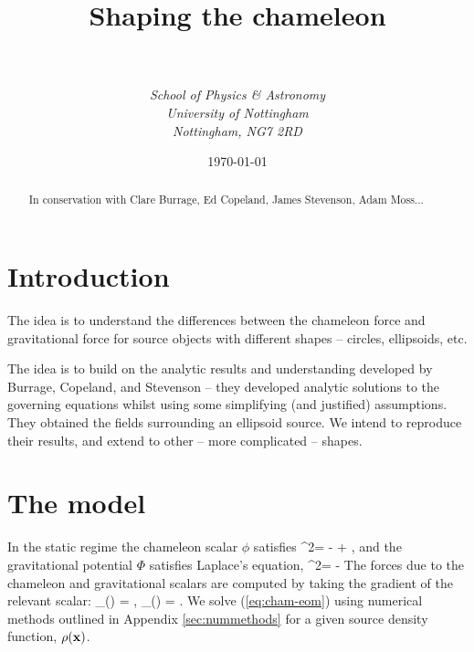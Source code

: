 \documentclass[a4paper, 12pt]{article}
\numberwithin{equation}{section}
\begin{document}
\title{{\bf Shaping the chameleon}}
\author{\\ \\ \it{School of Physics \& Astronomy} \\ \it{University of Nottingham} \\ \it{Nottingham, NG7 2RD}}

\date{\today}



\maketitle
\begin{abstract}
In conservation with Clare Burrage, Ed Copeland, James Stevenson, Adam Moss...
\end{abstract}

\tableofcontents   


\section{Introduction}
The idea is to understand the differences between the chameleon force and gravitational force for source objects with different shapes -- circles, ellipsoids, etc.

The idea is to build on the analytic results and understanding developed by Burrage, Copeland, and Stevenson -- they developed analytic solutions to the governing equations whilst using some simplifying (and justified) assumptions. They obtained the fields surrounding an ellipsoid source. We intend to reproduce their results, and extend to other -- more complicated -- shapes.
\section{The model}
In the static regime the chameleon scalar $\phi$ satisfies
\bse
\bea
\label{eq:cham-eom}
\nabla^2\phi = - + ,
\eea
and the gravitational potential $\Phi$ satisfies Laplace's equation,
\bea
\label{eq:laplaceseqn}
\nabla^2\Phi = - \rho
\eea
\ese
The forces due to the chameleon and gravitational scalars are computed by taking the gradient of the relevant scalar:
\bea
\label{eq:forces}
_{(\phi)} = \nabla\phi,\qquad
{}_{(\Phi)} = \nabla\Phi.
\eea
We solve (\ref{eq:cham-eom}) using numerical methods outlined in Appendix \ref{sec:nummethods} for a given  source density function, $\rho({\bf{x}})$. 
\end{document}
